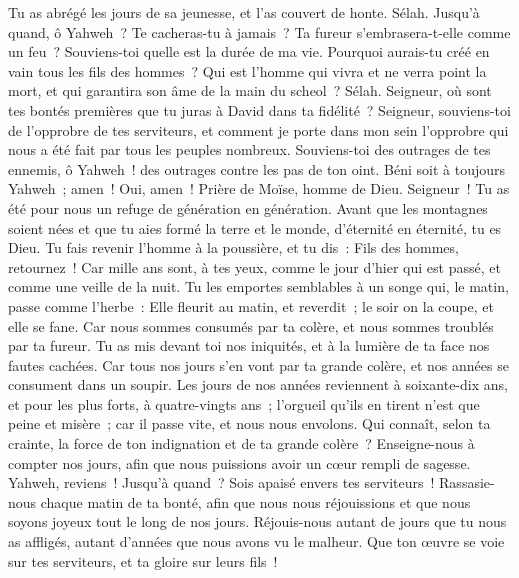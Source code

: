 \begin{multicols}{2}
Tu as abrégé les jours de sa jeunesse, et l'as couvert de honte. Sélah.
Jusqu'à quand, ô Yahweh~? Te cacheras-tu à jamais~? Ta fureur s'embrasera-t-elle comme un feu~?
Souviens-toi quelle est la durée de ma vie. Pourquoi aurais-tu créé en vain tous les fils des hommes~?
Qui est l'homme qui vivra et ne verra point la mort, et qui garantira son âme de la main du scheol~? Sélah.
Seigneur, où sont tes bontés premières que tu juras à David dans ta fidélité~?
Seigneur, souviens-toi de l'opprobre de tes serviteurs, et comment je porte dans mon sein l'opprobre qui nous a été fait par tous les peuples nombreux.
Souviens-toi des outrages de tes ennemis, ô Yahweh~! des outrages contre les pas de ton oint.
Béni soit à toujours Yahweh~; amen~! Oui, amen~!
\VerseOne{}Prière de Moïse, homme de Dieu. Seigneur~! Tu as été pour nous un refuge de génération en génération.
Avant que les montagnes soient nées et que tu aies formé la terre et le monde, d'éternité en éternité, tu es Dieu.
Tu fais revenir l'homme à la poussière, et tu dis~: Fils des hommes, retournez~!
Car mille ans sont, à tes yeux, comme le jour d'hier qui est passé, et comme une veille de la nuit.
Tu les emportes semblables à un songe qui, le matin, passe comme l'herbe~:
Elle fleurit au matin, et reverdit~; le soir on la coupe, et elle se fane.
Car nous sommes consumés par ta colère, et nous sommes troublés par ta fureur.
Tu as mis devant toi nos iniquités, et à la lumière de ta face nos fautes cachées.
Car tous nos jours s'en vont par ta grande colère, et nos années se consument dans un soupir.
Les jours de nos années reviennent à soixante-dix ans, et pour les plus forts, à quatre-vingts ans~; l'orgueil qu'ils en tirent n'est que peine et misère~; car il passe vite, et nous nous envolons.
Qui connaît, selon ta crainte, la force de ton indignation et de ta grande colère~?
Enseigne-nous à compter nos jours, afin que nous puissions avoir un cœur rempli de sagesse.
Yahweh, reviens~! Jusqu'à quand~? Sois apaisé envers tes serviteurs~!
Rassasie-nous chaque matin de ta bonté, afin que nous nous réjouissions et que nous soyons joyeux tout le long de nos jours.
Réjouis-nous autant de jours que tu nous as affligés, autant d'années que nous avons vu le malheur.
Que ton œuvre se voie sur tes serviteurs, et ta gloire sur leurs fils~!

\end{multicols}
